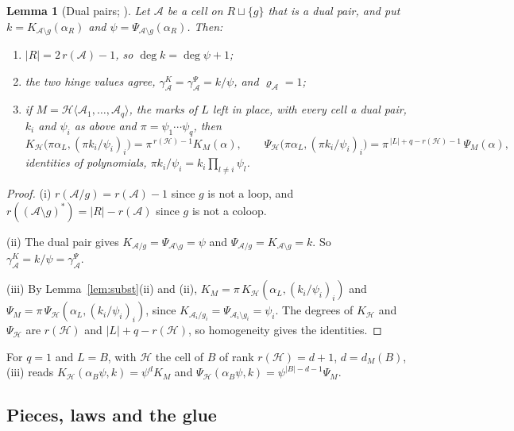 \documentclass[11pt]{article}
\theoremstyle{plain}
\newtheorem{lemma}[prop]{Lemma}
\theoremstyle{definition}
\theoremstyle{remark}
\begin{document}
\begin{lemma}[Dual pairs; {\cite[Thm.~20.4, p.~164; Cor.~22.8(ii), p.~186]{F}}]\label{lem:dualpair}
Let $\mathcal A$ be a cell on $R\sqcup\{g\}$ that is a dual pair, and put $k=K_{\mathcal A\setminus g}(\alpha_R)$ and $\psi=\Psi_{\mathcal A\setminus g}(\alpha_R)$. Then:
\begin{enumerate}[label=(\roman*)]
\item $|R|=2\,r(\mathcal A)-1$, so $\deg k=\deg\psi+1$;
\item the two hinge values agree, $\gamma^K_{\mathcal A}=\gamma^\Psi_{\mathcal A}=k/\psi$, and $\varrho_{\mathcal A}=1$;
\item if $M=\mathcal H\langle\mathcal A_1,\dots,\mathcal A_q\rangle$, the marks of $L$ left in place, with every cell a dual pair, $k_i$ and $\psi_i$ as above and $\pi=\psi_1\cdots\psi_q$, then
\[
K_{\mathcal H}\big(\pi\alpha_L,(\pi k_i/\psi_i)_i\big)=\pi^{\,r(\mathcal H)-1}K_M(\alpha),\qquad \Psi_{\mathcal H}\big(\pi\alpha_L,(\pi k_i/\psi_i)_i\big)=\pi^{\,|L|+q-r(\mathcal H)-1}\,\Psi_M(\alpha),
\]
identities of polynomials, $\pi k_i/\psi_i=k_i\prod_{l\neq i}\psi_l$.
\end{enumerate}
\end{lemma}

\begin{proof}
(i) $r(\mathcal A/g)=r(\mathcal A)-1$ since $g$ is not a loop, and $r((\mathcal A\setminus g)^\ast)=|R|-r(\mathcal A)$ since $g$ is not a coloop.

(ii) The dual pair gives $K_{\mathcal A/g}=\Psi_{\mathcal A\setminus g}=\psi$ and $\Psi_{\mathcal A/g}=K_{\mathcal A\setminus g}=k$. So $\gamma^K_{\mathcal A}=k/\psi=\gamma^\Psi_{\mathcal A}$.

(iii) By Lemma~\ref{lem:subst}(ii) and (ii), $K_M=\pi\,K_{\mathcal H}(\alpha_L,(k_i/\psi_i)_i)$ and $\Psi_M=\pi\,\Psi_{\mathcal H}(\alpha_L,(k_i/\psi_i)_i)$, since $K_{\mathcal A_i/g_i}=\Psi_{\mathcal A_i\setminus g_i}=\psi_i$. The degrees of $K_{\mathcal H}$ and $\Psi_{\mathcal H}$ are $r(\mathcal H)$ and $|L|+q-r(\mathcal H)$, so homogeneity gives the identities.
\end{proof}

For $q=1$ and $L=B$, with $\mathcal H$ the cell of $B$ of rank $r(\mathcal H)=d+1$, $d=d_M(B)$, (iii) reads $K_{\mathcal H}(\alpha_B\psi,k)=\psi^dK_M$ and $\Psi_{\mathcal H}(\alpha_B\psi,k)=\psi^{|B|-d-1}\Psi_M$.

\subsection{Pieces, laws and the glue}\label{sec:pieces}
\end{document}
